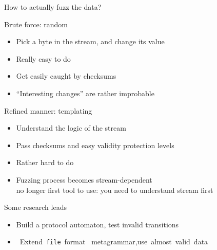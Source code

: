 \begin{frame}{How to actually fuzz the data?}
  \begin{block}{Brute force: \alert{random}}
    \begin{itemize}
    \item Pick a byte in the stream, and change its value
    \item[\Smiley] Really easy to do
    \item[\Frownie] Get easily caught by checksums
    \item[\Frownie] ``Interesting changes'' are rather improbable
    \end{itemize}
  \end{block}

  \begin{block}{Refined manner: \alert{templating}}
    \begin{itemize}
    \item Understand the logic of the stream
    \item[\Smiley] Pass checksums and easy validity protection levels
    \item[\Frownie] Rather hard to do
    \item[\Frownie] Fuzzing process becomes stream-dependent\\
      {\small no longer first tool to use: you need to understand stream first}
    \end{itemize}
  \end{block}

  \begin{block}{Some research leads}
    \begin{itemize}
    \item {} Build a protocol automaton, test
      invalid transitions
    \item {}~Extend~\texttt{file}~format~%
      metagrammar,use~almost~valid~data
    \end{itemize}
  \end{block}
\end{frame}
